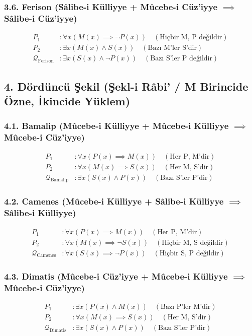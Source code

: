 \documentclass[11pt, a4paper]{article}
\begin{document}
\subsubsection{3.6. Ferison (Sâlibe-i Külliyye + Mûcebe-i Cüz'iyye $\implies$ Sâlibe-i Cüz'iyye)}
\begin{align}
P_1 &: \forall x (M(x) \implies \neg P(x)) \quad (\text{Hiçbir M, P değildir}) \\
P_2 &: \exists x (M(x) \land S(x)) \quad (\text{Bazı M'ler S'dir}) \\
\mathcal{Q}_{\text{Ferison}} &: \exists x (S(x) \land \neg P(x)) \quad (\text{Bazı S'ler P değildir})
\end{align}

\subsection{4. Dördüncü Şekil (Şekl-i Râbi' / M Birincide Özne, İkincide Yüklem)}

\subsubsection{4.1. Bamalip (Mûcebe-i Külliyye + Mûcebe-i Külliyye $\implies$ Mûcebe-i Cüz'iyye)}
\begin{align}
P_1 &: \forall x (P(x) \implies M(x)) \quad (\text{Her P, M'dir}) \\
P_2 &: \forall x (M(x) \implies S(x)) \quad (\text{Her M, S'dir}) \\
\mathcal{Q}_{\text{Bamalip}} &: \exists x (S(x) \land P(x)) \quad (\text{Bazı S'ler P'dir})
\end{align}

\subsubsection{4.2. Camenes (Mûcebe-i Külliyye + Sâlibe-i Külliyye $\implies$ Sâlibe-i Külliyye)}
\begin{align}
P_1 &: \forall x (P(x) \implies M(x)) \quad (\text{Her P, M'dir}) \\
P_2 &: \forall x (M(x) \implies \neg S(x)) \quad (\text{Hiçbir M, S değildir}) \\
\mathcal{Q}_{\text{Camenes}} &: \forall x (S(x) \implies \neg P(x)) \quad (\text{Hiçbir S, P değildir})
\end{align}

\subsubsection{4.3. Dimatis (Mûcebe-i Cüz'iyye + Mûcebe-i Külliyye $\implies$ Mûcebe-i Cüz'iyye)}
\begin{align}
P_1 &: \exists x (P(x) \land M(x)) \quad (\text{Bazı P'ler M'dir}) \\
P_2 &: \forall x (M(x) \implies S(x)) \quad (\text{Her M, S'dir}) \\
\mathcal{Q}_{\text{Dimatis}} &: \exists x (S(x) \land P(x)) \quad (\text{Bazı S'ler P'dir})
\end{align}
\end{document}

